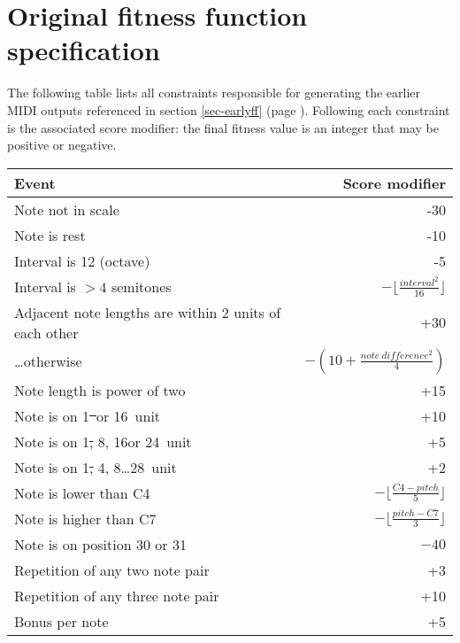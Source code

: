 \chapter{Original fitness function specification}
\label{appendix-old-ff}

The following table lists all constraints responsible for generating the earlier MIDI outputs referenced in section \ref{sec-earlyff} (page \pageref{sec-earlyff}). Following each constraint is the associated score modifier: the final fitness value is an integer that may be positive or negative.

\begin{center}
	\begin{tabular}{p{} r}
	\hline\hline
	Event & Score modifier \\ [0.5ex]
	\hline
	Note not in scale & -30 \\
	Note is rest\footnotemark & -10 \\
	Interval is 12 (octave) & -5 \\
	Interval is $> 4$  semitones & $-\lfloor \frac{interval^2}{16} \rfloor$ \\
	Adjacent note lengths are within 2 units of each other & +30 \\
	\ldots{}otherwise & $-(10 + \frac{note\ difference^2}{4})$ \\
	Note length is power of two & +15 \\
	Note is on 1\st\ or 16\th\ unit & +10 \\
	Note is on 1\st, 8\th, 16\th or 24\th\ unit & +5 \\
	Note is on 1\st, 4\th, 8\th\ldots 28\th\ unit & +2 \\
	Note is lower than C4 & $-\lfloor \frac{C4 - pitch}{5} \rfloor$ \\
	Note is higher than C7 & $-\lfloor \frac{pitch - C7}{3} \rfloor$ \\
	Note is on position 30 or 31\footnotemark & $-40$ \\
	Repetition of any two note pair & +3 \\
	Repetition of any three note pair & +10 \\
	Bonus per note\footnotemark & +5 \\ [1ex]
	\hline
	\end{tabular}
\end{center}

